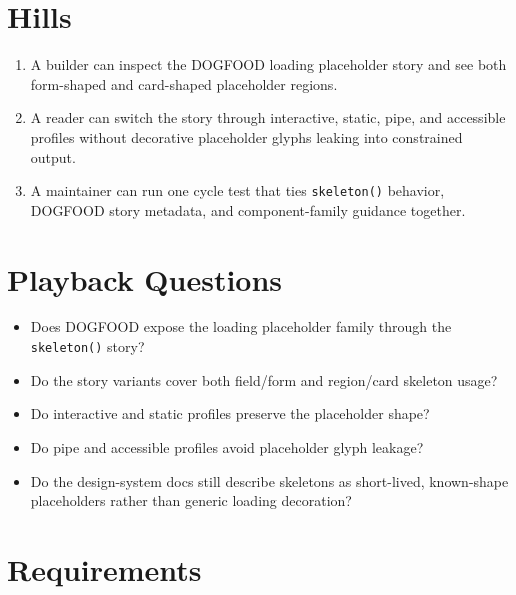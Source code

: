 \section{Hills}\label{record-093-hills}

\begin{enumerate}
\def\labelenumi{\arabic{enumi}.}
\tightlist
\item
  A builder can inspect the DOGFOOD loading placeholder story and see both form-shaped and card-shaped placeholder regions.
\item
  A reader can switch the story through interactive, static, pipe, and accessible profiles without decorative placeholder glyphs leaking into constrained output.
\item
  A maintainer can run one cycle test that ties \texttt{s\allowbreak{}k\allowbreak{}e\allowbreak{}l\allowbreak{}e\allowbreak{}t\allowbreak{}o\allowbreak{}n\allowbreak{}(\allowbreak{})} behavior, DOGFOOD story metadata, and component-family guidance together.
\end{enumerate}

\section{Playback Questions}\label{record-093-playback-questions}

\begin{itemize}
\tightlist
\item
  Does DOGFOOD expose the loading placeholder family through the \texttt{s\allowbreak{}k\allowbreak{}e\allowbreak{}l\allowbreak{}e\allowbreak{}t\allowbreak{}o\allowbreak{}n\allowbreak{}(\allowbreak{})} story?
\item
  Do the story variants cover both field/form and region/card skeleton usage?
\item
  Do interactive and static profiles preserve the placeholder shape?
\item
  Do pipe and accessible profiles avoid placeholder glyph leakage?
\item
  Do the design-system docs still describe skeletons as short-lived, known-shape placeholders rather than generic loading decoration?
\end{itemize}

\section{Requirements}\label{record-093-requirements}

